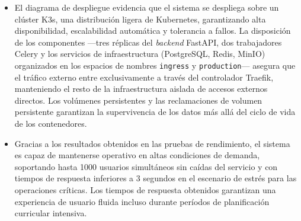 \begin{itemize}
    \item El diagrama de despliegue evidencia que el sistema se despliega sobre un clúster K3s, una 
    distribución ligera de Kubernetes, garantizando alta disponibilidad, escalabilidad automática y tolerancia a fallos. 
    La disposición de los componentes —tres réplicas del \textit{backend} FastAPI, dos trabajadores Celery y 
    los servicios de infraestructura (PostgreSQL, Redis, MinIO) organizados en los espacios de 
    nombres \texttt{ingress} y \texttt{production}— 
    asegura que el tráfico externo entre exclusivamente a través del controlador Traefik, 
    manteniendo el resto de la infraestructura aislada de accesos externos directos. Los 
    volúmenes persistentes y las reclamaciones de volumen persistente garantizan 
    la supervivencia de los datos más allá del ciclo de vida de los contenedores.

    \item Gracias a los resultados obtenidos en las pruebas de rendimiento, el sistema es capaz de mantenerse
    operativo en altas condiciones de demanda, soportando hasta 1000 usuarios simultáneos sin caídas
    del servicio y con tiempos de respuesta inferiores a 3 segundos en el escenario de estrés para las
    operaciones críticas. Los tiempos de respuesta obtenidos garantizan una experiencia de usuario fluida
    incluso durante períodos de planificación curricular intensiva.

\end{itemize} 